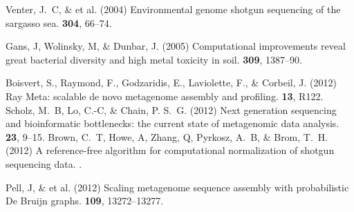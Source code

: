 \documentclass{pnastwo}
\begin{document}
\begin{article}
\begin{thebibliography}{10}
 Venter, J.~C, \& et al. \newblock (2004) Environmental genome shotgun sequencing of the sargasso
sea.  {\bf 304}, 66--74.
%

 Gans, J, Wolinsky, M, \& Dunbar, J. \newblock (2005)
Computational improvements reveal great bacterial diversity and high metal
toxicity in soil.  {\bf 309}, 1387--90.

 Boisvert, S., Raymond, F., Godzaridis, E., Laviolette, F., \& Corbeil, J. \newblock (2012) Ray Meta:
scalable de novo metagenome assembly and profiling.  {\bf 13}, R122.
 Scholz, M.~B, Lo, C.-C, \& Chain, P. S.~G. \newblock
(2012) Next generation sequencing and bioinformatic bottlenecks: the current
state of metagenomic data analysis.  {\bf 23}, 9--15.
%
 Brown, C.~T, Howe, A, Zhang, Q, Pyrkosz, A.~B, \& Brom,
T.~H. \newblock (2012) A reference-free algorithm for computational
normalization of shotgun sequencing data. .
%

 Pell, J, \& et al. \newblock (2012) {Scaling metagenome sequence assembly
with probabilistic De Bruijn graphs}.  {\bf 109}, 13272--13277.

%



\end{thebibliography}
\end{article}
\end{document}
